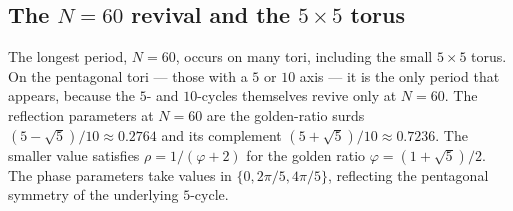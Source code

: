 \subsection{The $N = 60$ revival and the $5 \times 5$ torus}
The longest period, $N = 60$, occurs on many tori, including
the small $5 \times 5$ torus. On the pentagonal tori --- those with
a $5$ or $10$ axis --- it is the only period that appears,
because the $5$- and $10$-cycles themselves revive only at
$N = 60$. The reflection parameters at $N = 60$ are the
golden-ratio surds $(5 - \sqrt{5})/10 \approx 0.2764$ and
its complement $(5 + \sqrt{5})/10 \approx 0.7236$. The
smaller value satisfies $\rho = 1/(\varphi + 2)$ for the
golden ratio $\varphi = (1 + \sqrt{5})/2$. The phase
parameters take values in $\{0, 2\pi/5, 4\pi/5\}$,
reflecting the pentagonal symmetry of the underlying
$5$-cycle. 
